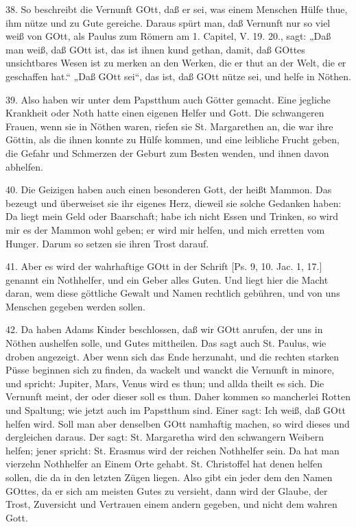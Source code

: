 38. So beschreibt die Vernunft GOtt, daß er sei, was einem Menschen Hülfe thue, ihm nütze und zu Gute gereiche. Daraus spürt man, daß Vernunft nur so viel weiß von GOtt, als Paulus zum Römern am 1. Capitel, V. 19. 20., sagt: „Daß man weiß, daß GOtt ist, das ist ihnen kund gethan, damit, daß GOttes unsichtbares Wesen ist zu merken an den Werken, die er thut an der Welt, die er geschaffen hat.“ „Daß GOtt sei“, das ist, daß GOtt nütze sei, und helfe in Nöthen.

39. Also haben wir unter dem Papstthum auch Götter gemacht. Eine jegliche Krankheit oder Noth hatte einen eigenen Helfer und Gott. Die schwangeren Frauen, wenn sie in Nöthen waren, riefen sie St. Margarethen an, die war ihre Göttin, als die ihnen konnte zu Hülfe kommen, und eine leibliche Frucht geben, die Gefahr und Schmerzen der Geburt zum Besten wenden, und ihnen davon abhelfen.

40. Die Geizigen haben auch einen besonderen Gott, der heißt Mammon. Das bezeugt und überweiset sie ihr eigenes Herz, dieweil sie solche Gedanken haben: Da liegt mein Geld oder Baarschaft; habe ich nicht Essen und Trinken, so wird mir es der Mammon wohl geben; er wird mir helfen, und mich erretten vom Hunger. Darum so setzen sie ihren Trost darauf.

41. Aber es wird der wahrhaftige GOtt in der Schrift [Ps. 9, 10. Jac. 1, 17.] genannt ein Nothhelfer, und ein Geber alles Guten. Und liegt hier die Macht daran, wem diese göttliche Gewalt und Namen rechtlich gebühren, und von uns Menschen gegeben werden sollen.

42. Da haben Adams Kinder beschlossen, daß wir GOtt anrufen, der uns in Nöthen aushelfen solle, und Gutes mittheilen. Das sagt auch St. Paulus, wie droben angezeigt. Aber wenn sich das Ende herzunaht, und die rechten starken Püsse beginnen sich zu finden, da wackelt und wanckt die Vernunft in minore, und spricht: Jupiter, Mars, Venus wird es thun; und allda theilt es sich. Die Vernunft meint, der oder dieser soll es thun. Daher kommen so mancherlei Rotten und Spaltung; wie jetzt auch im Papstthum sind. Einer sagt: Ich weiß, daß GOtt helfen wird. Soll man aber denselben GOtt namhaftig machen, so wird dieses und dergleichen daraus. Der sagt: St. Margaretha wird den schwangern Weibern helfen; jener spricht: St. Erasmus wird der reichen Nothhelfer sein. Da hat man vierzehn Nothhelfer an Einem Orte gehabt. St. Christoffel hat denen helfen sollen, die da in den letzten Zügen liegen. Also gibt ein jeder dem den Namen GOttes, da er sich am meisten Gutes zu versieht, dann wird der Glaube, der Trost, Zuversicht und Vertrauen einem andern gegeben, und nicht dem wahren Gott.

